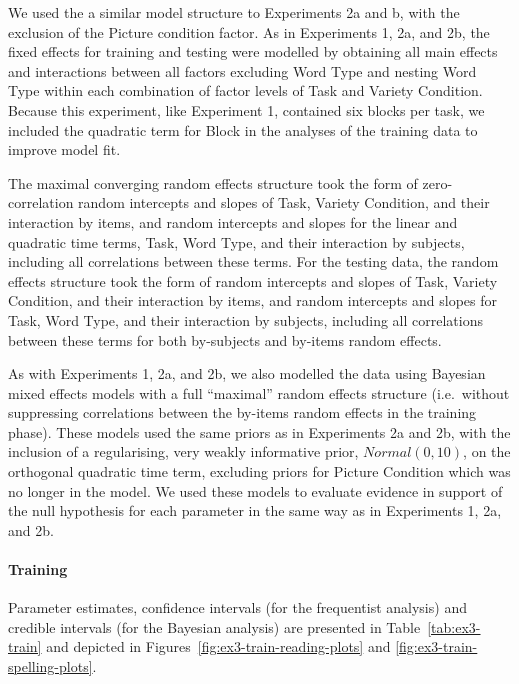 \documentclass[doc,floatsintext]{apa6}
\let\oldparagraph\paragraph
\renewcommand{\paragraph}[1]{\oldparagraph{#1}\mbox{}}
\begin{document}
We used the a similar model structure to Experiments 2a and b, with the
exclusion of the Picture condition factor. As in Experiments 1, 2a, and
2b, the fixed effects for training and testing were modelled by
obtaining all main effects and interactions between all factors
excluding Word Type and nesting Word Type within each combination of
factor levels of Task and Variety Condition. Because this experiment,
like Experiment 1, contained six blocks per task, we included the
quadratic term for Block in the analyses of the training data to improve
model fit.

The maximal converging random effects structure took the form of
zero-correlation random intercepts and slopes of Task, Variety
Condition, and their interaction by items, and random intercepts and
slopes for the linear and quadratic time terms, Task, Word Type, and
their interaction by subjects, including all correlations between these
terms. For the testing data, the random effects structure took the form
of random intercepts and slopes of Task, Variety Condition, and their
interaction by items, and random intercepts and slopes for Task, Word
Type, and their interaction by subjects, including all correlations
between these terms for both by-subjects and by-items random effects.

As with Experiments 1, 2a, and 2b, we also modelled the data using
Bayesian mixed effects models with a full \enquote{maximal} random
effects structure (i.e.~without suppressing correlations between the
by-items random effects in the training phase). These models used the
same priors as in Experiments 2a and 2b, with the inclusion of a
regularising, very weakly informative prior, \(Normal(0, 10)\), on the
orthogonal quadratic time term, excluding priors for Picture Condition
which was no longer in the model. We used these models to evaluate
evidence in support of the null hypothesis for each parameter in the
same way as in Experiments 1, 2a, and 2b.

\paragraph{Training}\label{training-3}

Parameter estimates, confidence intervals (for the frequentist analysis)
and credible intervals (for the Bayesian analysis) are presented in
Table~\ref{tab:ex3-train} and depicted in
Figures~\ref{fig:ex3-train-reading-plots} and
\ref{fig:ex3-train-spelling-plots}.
\end{document}
